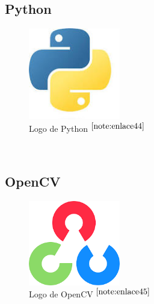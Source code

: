 \setcounter{footnote}{43} %

\subsection{Python}

\begin{figure} [h!]
	\begin{center}
		\includegraphics[width=4cm]{figs/python.png}
	\end{center}
	\caption{Logo de Python $^{\ref{note:enlace44}}$} 
	\label{fig:python}
\end{figure}\

\setcounter{footnote}{44} %

\subsection{OpenCV}

\begin{figure} [h!]
	\begin{center}
		\includegraphics[width=4cm]{figs/opencv.png}
	\end{center}
	\caption{Logo de OpenCV $^{\ref{note:enlace45}}$} 
	\label{fig:opencv}
\end{figure}\

\setcounter{footnote}{45} %

